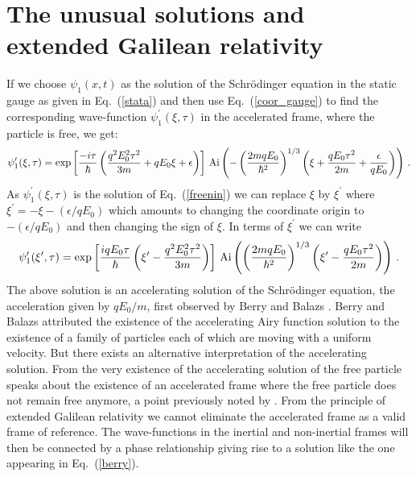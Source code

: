 \documentclass[12pt]{article}
\begin{document}
\section{The unusual solutions and extended Galilean relativity}
\label{rel}
If we choose $\psi_1(x,t)$ as the solution of the Schr\"{o}dinger equation in
the static gauge as given in Eq.~(\ref{stata}) and then use
Eq.~(\ref{coor_gauge}) to find the corresponding wave-function
$\psi^\prime_1(\xi,\tau)$ in the accelerated frame, where the particle is free,
we get:
%
\begin{eqnarray}
\psi^\prime_1(\xi,\tau)= \exp\left[\frac{-i\tau}{\hbar}\left(
\frac{q^2 E_0^2 \tau^2}{3m} + qE_0\xi + \epsilon
\right)\right]\,{\rm Ai}\left(-\left(\frac{2mqE_0}{\hbar^2}\right)^{1/3}
\left(\xi + \frac{qE_0\tau^2}{2m} + \frac{\epsilon}{qE_0}\right)\right)\,.
\nonumber
\end{eqnarray}
%
As $\psi^\prime_1(\xi,\tau)$ is the solution of 
Eq.~(\ref{freenin}) we can replace $\xi$ by $\xi^\prime$ where
$\xi^\prime=-\xi - (\epsilon/qE_0)$ which amounts to changing the coordinate
origin to $-(\epsilon/qE_0)$ and then changing the sign of $\xi$. In terms of 
$\xi^\prime$ we can write
%
\begin{eqnarray}
\psi^\prime_1(\xi^\prime,\tau)= \exp\left[\frac{iqE_0\tau}{\hbar}\left(
\xi^\prime - \frac{q^2 E_0^2 \tau^2}{3m}
\right)\right]\,{\rm Ai}\left(\left(\frac{2mqE_0}{\hbar^2}\right)^{1/3}
\left(\xi^\prime - \frac{qE_0\tau^2}{2m}\right)\right)\,.
\label{berry}
\end{eqnarray}
%
The above solution is an accelerating solution of the Schr\"{o}dinger
equation, the acceleration given by $qE_0/m$, first observed by Berry and
Balazs \cite{berry}. Berry and Balazs attributed the existence of the
accelerating Airy function solution to the existence of a family of particles
each of which are moving with a uniform velocity.  But there exists an
alternative interpretation of the accelerating solution.  From the very
existence of the accelerating solution of the free particle speaks about the
existence of an accelerated frame where the free particle does not remain
free anymore, a point previously noted by \cite{greenberger}. From the
principle of extended Galilean relativity we cannot eliminate the accelerated
frame as a valid frame of reference. The wave-functions in the inertial and
non-inertial frames will then be connected by a phase relationship giving rise
to a solution like the one appearing in Eq.~(\ref{berry}).
\end{document}
